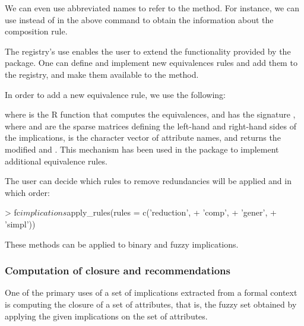 We can even use abbreviated names to refer to the method. For instance,
we can use  instead of  in the above
command to obtain the information about the composition rule.

The registry's use enables the user to extend the functionality provided
by the  package. One can define and implement new equivalences
rules and add them to the registry, and make them available to the
 method.

In order to add a new equivalence rule, we use the following:

where  is the R function that computes the
equivalences, and has the signature
, where  and 
are the sparse matrices defining the left-hand and right-hand sides of
the implications,  is the character vector of attribute
names, and returns the modified  and . This
mechanism has been used in the package to implement additional
equivalence rules.

The user can decide which rules to remove redundancies will be applied
and in which order:

\begin{example}
> fc$implications$apply_rules(rules = c('reduction',
+                                       'comp',
+                                       'gener',
+                                       'simpl'))
\end{example}

These methods can be applied to binary and fuzzy implications.

\hypertarget{computation-of-closure-and-recommendations}{%
\subsubsection{Computation of closure and
recommendations}\label{computation-of-closure-and-recommendations}}

One of the primary uses of a set of implications extracted from a formal
context is computing the closure of a set of attributes, that is, the
fuzzy set obtained by applying the given implications on the set of
attributes.

